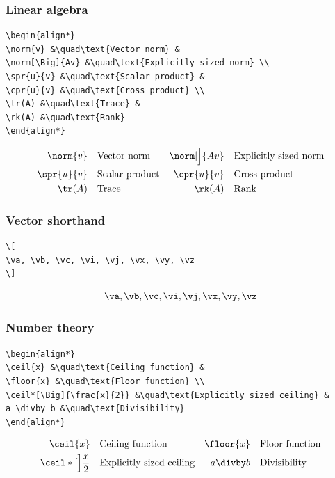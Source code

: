 \documentclass{article}
\begin{document}
\subsubsection*{Linear algebra}
\begin{verbatim}
\begin{align*}
\norm{v} &\quad\text{Vector norm} &
\norm[\Big]{Av} &\quad\text{Explicitly sized norm} \\
\spr{u}{v} &\quad\text{Scalar product} &
\cpr{u}{v} &\quad\text{Cross product} \\
\tr(A) &\quad\text{Trace} &
\rk(A) &\quad\text{Rank}
\end{align*}
\end{verbatim}
\begin{align*}
\norm{v} &\quad\text{Vector norm} &
\norm[\Big]{Av} &\quad\text{Explicitly sized norm} \\
\spr{u}{v} &\quad\text{Scalar product} &
\cpr{u}{v} &\quad\text{Cross product} \\
\tr(A) &\quad\text{Trace} &
\rk(A) &\quad\text{Rank}
\end{align*}

\subsubsection*{Vector shorthand}
\begin{verbatim}
\[
\va, \vb, \vc, \vi, \vj, \vx, \vy, \vz
\]
\end{verbatim}
\[
\va, \vb, \vc, \vi, \vj, \vx, \vy, \vz
\]

\subsubsection*{Number theory}
\begin{verbatim}
\begin{align*}
\ceil{x} &\quad\text{Ceiling function} &
\floor{x} &\quad\text{Floor function} \\
\ceil*[\Big]{\frac{x}{2}} &\quad\text{Explicitly sized ceiling} &
a \divby b &\quad\text{Divisibility}
\end{align*}
\end{verbatim}
\begin{align*}
\ceil{x} &\quad\text{Ceiling function} &
\floor{x} &\quad\text{Floor function} \\
\ceil*[\Big]{\frac{x}{2}} &\quad\text{Explicitly sized ceiling} &
a \divby b &\quad\text{Divisibility}
\end{align*}
\end{document}
